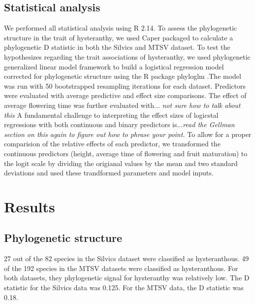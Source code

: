 \documentclass{article}\usepackage[]{graphicx}\usepackage[]{color}
\begin{document}
\subsection*{Statistical analysis}
We performed all statistical analysis using R 2.14. To assess the phylogenetic structure in the trait of hysteranthy, we used Caper packaged \citep{} to calculate a phylogenetic D statistic \citep{Fritz2010} in both the Silvics and MTSV dataset. To test the hypothesizes regarding the trait associations of hysteranthy, we used phylogenetic generalized linear model framework \citep{Ives2010} to build a logistical regression model corrected for phylogenetic structure using the R package phyloglm \citep{}.The model was run with 50 bootstrapped resampling iterations for each dataset. Predictors were evaluated with average predictive and effect size comparisons. The effect of average flowering time was further evaluated with... \textit{not sure how to talk about this} A fundamental challenge to interpreting the effect sizes of logicstal regressions with both continuous and binary predictors is...\textit{read the Gellman section on this again to figure out how to phrase your point.} To allow for a proper comparision of the relative effects of each predictor, we transformed the continuous predictors (height, average time of flowering and fruit maturation) to the logit scale by dividing the origianal values by the mean and two standard deviations \citep{Gellman} and used these trandformed parameters and model inputs.
\section*{Results}
\subsection*{Phylogenetic structure}
27 out of the 82 species in the Silvics dataset were classified as hysteranthous. 49 of the 192 species in the MTSV datasets were classified as hysteranthous. For both datasets, they phylogenetic signal for hysteranthy was relatively low. The D statistic for the Silvics data was 0.125. For the MTSV data, the D statistic was 0.18.
\end{document}

